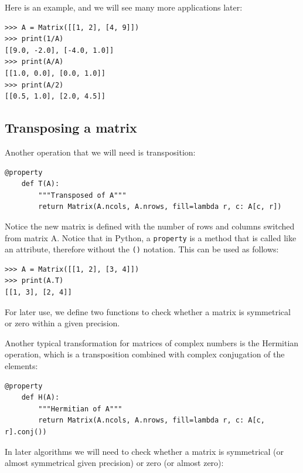 \documentclass[justified, sixbynine]{tufte-book}
\def\ft{\small\tt}
\theoremstyle{plain}%
\newtheorem * {corollary}{Corollary}
\theoremstyle{definition}
\theoremstyle{remark}
\newtheorem * {remark}{Remark}
\newtheorem * {note}{Note}
\begin{document}
\begin{fullwidth}
Here is an example, and we will see many more applications later:

\begin{lstlisting}[caption={in file: {\ft nlib.py}}]
>>> A = Matrix([[1, 2], [4, 9]])
>>> print(1/A)
[[9.0, -2.0], [-4.0, 1.0]]
>>> print(A/A)
[[1.0, 0.0], [0.0, 1.0]]
>>> print(A/2)
[[0.5, 1.0], [2.0, 4.5]]
\end{lstlisting}

\goodbreak\subsection{Transposing a matrix}


Another operation that we will need is transposition:

\begin{lstlisting}[caption={in file: {\ft nlib.py}}]
    @property
    def T(A):
        """Transposed of A"""
        return Matrix(A.ncols, A.nrows, fill=lambda r, c: A[c, r])
\end{lstlisting}

Notice the new matrix is defined with the number of rows and columns switched from matrix A. Notice that in Python, a {\ft property} is a method that is called like an attribute, therefore without the {\ft ()} notation.
This can be used as follows:

\begin{lstlisting}[caption={in file: {\ft nlib.py}}]
>>> A = Matrix([[1, 2], [3, 4]])
>>> print(A.T)
[[1, 3], [2, 4]]
\end{lstlisting}

For later use, we define two functions to check whether a matrix is symmetrical or zero within a given precision.

Another typical transformation for matrices of complex numbers is the Hermitian operation, which is a transposition combined with complex conjugation of the elements:

\begin{lstlisting}[caption={in file: {\ft nlib.py}}]
    @property
    def H(A):
        """Hermitian of A"""
        return Matrix(A.ncols, A.nrows, fill=lambda r, c: A[c, r].conj())
\end{lstlisting}


In later algorithms we will need to check whether a matrix is symmetrical (or almost symmetrical given precision) or zero (or almost zero):


\end{fullwidth}
\end{document}
